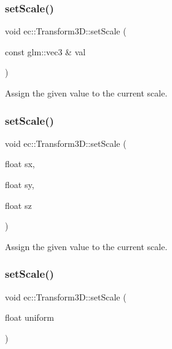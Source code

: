 \subsubsection{\texorpdfstring{set\+Scale()}{setScale()}\hspace{0.1cm}{\footnotesize\ttfamily [1/3]}}
{\footnotesize\ttfamily void ec\+::\+Transform3\+D\+::set\+Scale (\begin{DoxyParamCaption}\item[{const glm\+::vec3 \&}]{val }\end{DoxyParamCaption})}

Assign the given value to the current scale. \mbox{\label{classec_1_1_transform3_d_a604f8cab4d669b713e04b57a7cc57c0c}} 
\subsubsection{\texorpdfstring{set\+Scale()}{setScale()}\hspace{0.1cm}{\footnotesize\ttfamily [2/3]}}
{\footnotesize\ttfamily void ec\+::\+Transform3\+D\+::set\+Scale (\begin{DoxyParamCaption}\item[{float}]{sx,  }\item[{float}]{sy,  }\item[{float}]{sz }\end{DoxyParamCaption})}

Assign the given value to the current scale. \mbox{\label{classec_1_1_transform3_d_a2bdde49d328296d1a77586ee00f4bf4e}} 
\subsubsection{\texorpdfstring{set\+Scale()}{setScale()}\hspace{0.1cm}{\footnotesize\ttfamily [3/3]}}
{\footnotesize\ttfamily void ec\+::\+Transform3\+D\+::set\+Scale (\begin{DoxyParamCaption}\item[{float}]{uniform }\end{DoxyParamCaption})}

